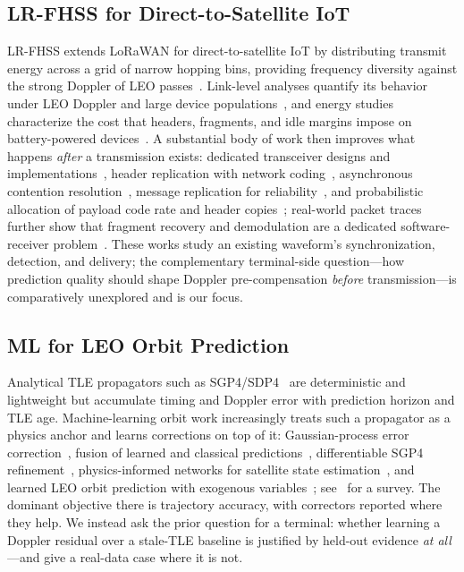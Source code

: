 \documentclass[conference]{IEEEtran}
\begin{document}
\subsection{LR-FHSS for Direct-to-Satellite IoT}
LR-FHSS extends LoRaWAN for direct-to-satellite IoT by distributing transmit
energy across a grid of narrow hopping bins, providing frequency diversity
against the strong Doppler of LEO passes~\cite{semtech2023lrfhss,boquet2021lrfhss}.
Link-level analyses quantify its behavior under LEO Doppler and large device
populations~\cite{ullah2022lrfhss,hurn2023lrfhss}, and energy studies characterize
the cost that headers, fragments, and idle margins impose on battery-powered
devices~\cite{sanchez2024energy}. A substantial body of work then improves what
happens \emph{after} a transmission exists: dedicated transceiver designs and
implementations~\cite{jung2023lrfhss,jung2025lrfhss}, header replication with
network coding~\cite{knop2024header}, asynchronous contention
resolution~\cite{santana2024acrda}, message replication for
reliability~\cite{rathi2024replication}, and probabilistic allocation of payload
code rate and header copies~\cite{farhat2025probabilistic}; real-world packet
traces further show that fragment recovery and demodulation are a dedicated
software-receiver problem~\cite{bukhari2023lrfhss}. These works study an existing
waveform's synchronization, detection, and delivery; the complementary
terminal-side question---how prediction quality should shape Doppler
pre-compensation \emph{before} transmission---is comparatively unexplored and is
our focus.

\subsection{ML for LEO Orbit Prediction}
Analytical TLE propagators such as
SGP4/SDP4~\cite{hoots1980models,vallado2007fundamentals,vallado2006revisiting}
are deterministic and lightweight but accumulate timing and Doppler error with
prediction horizon and TLE age. Machine-learning orbit work increasingly treats
such a propagator as a physics anchor and learns corrections on top of it:
Gaussian-process error correction~\cite{peng2019gp}, fusion of learned and
classical predictions~\cite{peng2021fusion}, differentiable SGP4
refinement~\cite{acciarini2025dsgp4}, physics-informed networks for satellite
state estimation~\cite{varey2024pinn}, and learned LEO orbit prediction with
exogenous variables~\cite{caldas2024leo}; see~\cite{caldas2024mlorbit} for a
survey. The dominant objective there is trajectory accuracy, with correctors
reported where they help. We instead ask the prior question for a terminal:
whether learning a Doppler residual over a stale-TLE baseline is justified by
held-out evidence \emph{at all}---and give a real-data case where it is not.
\end{document}

